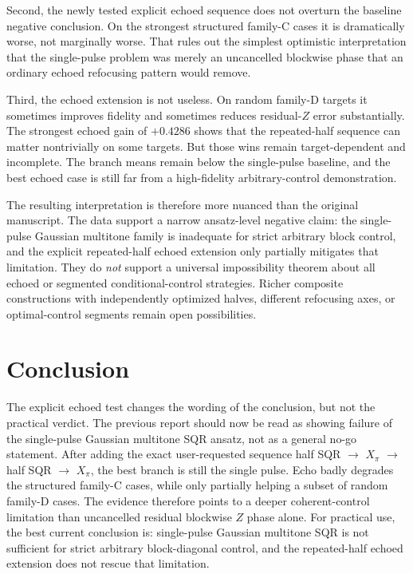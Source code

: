\documentclass[aps,pra,twocolumn,reprint,floatfix,amsmath,amssymb]{revtex4-2}
\begin{document}
Second, the newly tested explicit echoed sequence does not overturn the baseline negative conclusion. On the strongest structured family-C cases it is dramatically worse, not marginally worse. That rules out the simplest optimistic interpretation that the single-pulse problem was merely an uncancelled blockwise phase that an ordinary echoed refocusing pattern would remove.

Third, the echoed extension is not useless. On random family-D targets it sometimes improves fidelity and sometimes reduces residual-\(Z\) error substantially. The strongest echoed gain of \(+0.4286\) shows that the repeated-half sequence can matter nontrivially on some targets. But those wins remain target-dependent and incomplete. The branch means remain below the single-pulse baseline, and the best echoed case is still far from a high-fidelity arbitrary-control demonstration.

The resulting interpretation is therefore more nuanced than the original manuscript. The data support a narrow ansatz-level negative claim: the single-pulse Gaussian multitone family is inadequate for strict arbitrary block control, and the explicit repeated-half echoed extension only partially mitigates that limitation. They do \emph{not} support a universal impossibility theorem about all echoed or segmented conditional-control strategies. Richer composite constructions with independently optimized halves, different refocusing axes, or optimal-control segments remain open possibilities.

\section{Conclusion}
The explicit echoed test changes the wording of the conclusion, but not the practical verdict. The previous report should now be read as showing failure of the single-pulse Gaussian multitone SQR ansatz, not as a general no-go statement. After adding the exact user-requested sequence half SQR \(\rightarrow\) \(X_\pi\) \(\rightarrow\) half SQR \(\rightarrow\) \(X_\pi\), the best branch is still the single pulse. Echo badly degrades the structured family-C cases, while only partially helping a subset of random family-D cases. The evidence therefore points to a deeper coherent-control limitation than uncancelled residual blockwise \(Z\) phase alone. For practical use, the best current conclusion is: single-pulse Gaussian multitone SQR is not sufficient for strict arbitrary block-diagonal control, and the repeated-half echoed extension does not rescue that limitation.
\end{document}
